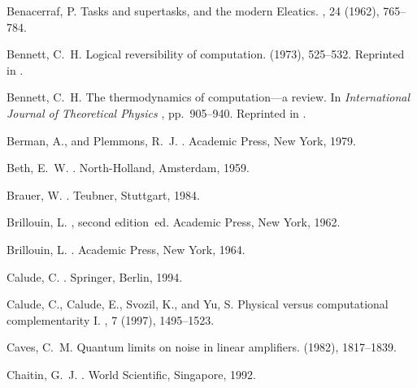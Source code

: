 %
%

\begin{thebibliography}{10}

{\sc Benacerraf, P.}
\newblock Tasks and supertasks, and the modern {E}leatics.
, 24 (1962), 765--784.

{\sc Bennett, C.~H.}
\newblock Logical reversibility of computation.
 (1973), 525--532.
\newblock Reprinted in \cite[pp. 197-204]{maxwell-demon}.

{\sc Bennett, C.~H.}
\newblock The thermodynamics of computation---a review.
\newblock In {\em International Journal of Theoretical Physics\/}
  \cite{maxwell-demon}, pp.~905--940.
\newblock Reprinted in \cite[pp. 213-248]{maxwell-demon}.

{\sc Berman, A., and Plemmons, R.~J.}
.
\newblock Academic Press, New York, 1979.

{\sc Beth, E.~W.}
.
\newblock North-Holland, Amsterdam, 1959.

{\sc Brauer, W.}
.
\newblock Teubner, Stuttgart, 1984.

{\sc Brillouin, L.}
, second edition~ed.
\newblock Academic Press, New York, 1962.

{\sc Brillouin, L.}
.
\newblock Academic Press, New York, 1964.

{\sc Calude, C.}
.
\newblock Springer, Berlin, 1994.

{\sc Calude, C., Calude, E., Svozil, K., and Yu, S.}
\newblock Physical versus computational complementarity {I}.
, 7 (1997),
  1495--1523.

{\sc Caves, C.~M.}
\newblock Quantum limits on noise in linear amplifiers.
 (1982), 1817--1839.

{\sc Chaitin, G.~J.}
.
\newblock World Scientific, Singapore, 1992.


\end{thebibliography}
